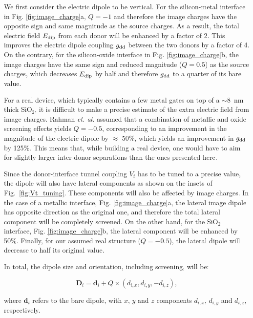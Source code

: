 We first consider the electric dipole to be vertical. For the silicon-metal interface in Fig. \ref{fig:image_charge}a, $Q=-1$ and therefore the image charges have the opposite sign and same magnitude as the source charges. As a result, the total electric field  $E_{\rm dip}$ from each donor will be enhanced by a factor of 2. This improves the electric dipole coupling $g_{\rm dd}$ between the two donors by a factor of 4. On the contrary, for the silicon-oxide interface in Fig. \ref{fig:image_charge}b, the image charges have the same sign and reduced magnitude ($Q=0.5$) as the source charges, which decreases $E_{\rm dip}$ by half and therefore $g_{\rm dd}$ to a quarter of its bare value.

For a real device, which typically contains a few metal gates on top of a $\sim8$~nm thick SiO$_2$, it is difficult to make a precise estimate of the extra electric field from image charges. Rahman \textit{et. al.} \cite{Rahman2009} assumed that a combination of metallic and oxide screening effects yields $Q=-0.5$, corresponding to an improvement in the magnitude of the electric dipole by $\approx$ 50\%, which yields an improvement in $g_{\rm dd}$ by 125\%. 
This means that, while building a real device, one would have to aim for slightly larger inter-donor separations than the ones presented here.

Since the donor-interface tunnel coupling $V_t$ has to be tuned to a precise value, the dipole will also have lateral components as shown on the insets of Fig.~\ref{fig:Vt_tuning}. These components will also be affected by image charges. In the case of a metallic interface, Fig. \ref{fig:image_charge}a, the lateral image dipole has opposite direction as the original one, and therefore the total lateral component will be completely screened. On the other hand, for the SiO$_2$ interface, Fig. \ref{fig:image_charge}b, the lateral component will be enhanced by 50\%. Finally, for our assumed real structure ($Q=-0.5$), the lateral dipole will decrease to half its original value.

In total, the dipole size and orientation, including screening, will be:

\begin{equation} \label{eq:D_ic}
\textbf{D}_i=\textbf{d}_i+Q\times(d_{i,x},d_{i,y},-d_{i,z}),
\end{equation}

where $\textbf{d}_i$ refers to the bare dipole, with $x$, $y$ and $z$ components $d_{i,x}$, $d_{i,y}$ and $d_{i,z}$, respectively.

